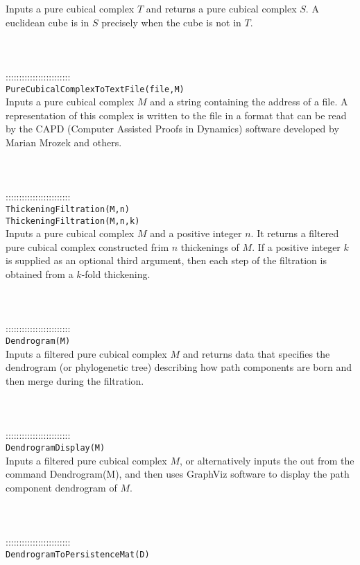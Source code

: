 \documentclass[a4paper,11pt]{report}
\begin{document}
{ Inputs a pure cubical complex $T$ and returns a pure cubical complex $S$. A euclidean cube is in $S$ precisely when the cube is not in $T$. \\
 \\
 \\
 \\
 ::::::::::::::::::::::::\\
 \texttt{PureCubicalComplexToTextFile(file,M)}\\
 

 Inputs a pure cubical complex $M$ and a string containing the address of a file. A representation of this
complex is written to the file in a format that can be read by the CAPD
(Computer Assisted Proofs in Dynamics) software developed by Marian Mrozek and
others. \\
 \\
 \\
 \\
 ::::::::::::::::::::::::\\
 \texttt{ThickeningFiltration(M,n)}\\
 \texttt{ThickeningFiltration(M,n,k)}\\
 

 Inputs a pure cubical complex $M$ and a positive integer $n$. It returns a filtered pure cubical complex constructed frim $n$ thickenings of $M$. If a positive integer $k$ is supplied as an optional third argument, then each step of the filtration is
obtained from a $k$-fold thickening. \\
 \\
 \\
 \\
 ::::::::::::::::::::::::\\
 \texttt{Dendrogram(M)}\\
 

 Inputs a filtered pure cubical complex $M$ and returns data that specifies the dendrogram (or phylogenetic tree)
describing how path components are born and then merge during the filtration. \\
 \\
 \\
 \\
 ::::::::::::::::::::::::\\
 \texttt{DendrogramDisplay(M)}\\
 

 Inputs a filtered pure cubical complex $M$, or alternatively inputs the out from the command Dendrogram(M), and then
uses GraphViz software to display the path component dendrogram of $M$. \\
 \\
 \\
 \\
 ::::::::::::::::::::::::\\
 \texttt{DendrogramToPersistenceMat(D)}\\
 

}
\end{document}
